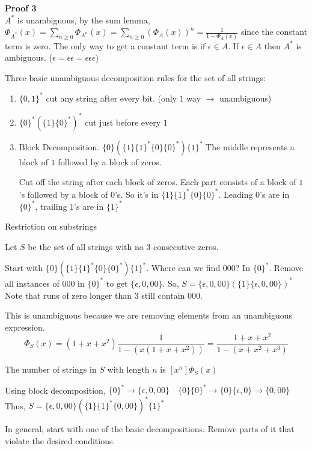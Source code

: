 \documentclass{article}
\begin{document}
\textbf{Proof 3\\}
$A^*$ is unambiguous, by the sum lemma, $\Phi_{A^*}(x) = \sum_{n \ge 0}\Phi_{A^n}(x) = \sum_{n \ge 0}(\Phi_A(x))^n = \frac{1}{1 - \Phi_A(x)}$ since the constant term is zero. The only way to get a constant term is if $\epsilon \in A$. If $\epsilon \in A$ then $A^*$ is ambiguous. ($\epsilon = \epsilon \epsilon = \epsilon \epsilon \epsilon$)

Three basic unambiguous decomposition rules for the set of all strings:
\begin{enumerate}
	\item $\{ 0,1 \}^*$ cut any string after every bit. (only $1$ way $\rightarrow$ unambiguous)
	\item $\{ 0 \}^*(\{1\}\{0\}^*)^*$ cut just before every $1$
	\item Block Decomposition. $\{0\}(\{1\}\{1\}^*\{0\}\{0\}^*)\{1\}^*$ The middle represents a block of $1$ followed by a block of zeros.

		Cut off the string after each block of zeros. Each part consists of a block of $1$'s followed by a block of $0$'s. So it's in $\{1\}\{1\}^*\{0\}\{0\}^*$. Leading $0$'s are in $\{0\}^*$, trailing $1$'s are in $\{1\}^*$
\end{enumerate}

Restriction on substrings

\example
Let $S$ be the set of all strings with no $3$ consecutive zeros.

Start with $\{0\}(\{1\}\{1\}^*\{0\}\{0\}^*)\{1\}^*$. Where can we find $000$? In $\{0\}^*$. Remove all instances of $000$ in $\{0\}^*$ to get $\{ \epsilon , 0, 00 \}$. So, $S = \{ \epsilon , 0, 00 \}(\{1\}\{ \epsilon , 0,00\})^*$ Note that runs of zero longer than $3$ still contain $000$.

This is unambiguous because we are removing elements from an unambiguous expression.
$$\Phi_S(x) = (1+x+x^2)\frac{1}{1-(x(1+x+x^2))} = \frac{1 + x+x^2}{1-(x+x^2+x^3)}$$

The number of strings in $S$ with length $n$ is $[x^n]\Phi_S(x)$

Using block decomposition, $\{0\}^* \rightarrow \{ \epsilon , 0,00 \} \quad \{0\}\{0\}^* \rightarrow \{0\}\{ \epsilon, 0\} \rightarrow \{0,00\}$ Thus, $S = \{ \epsilon,0,00\}(\{1\}\{1\}^*\{0,00\})^*\{1\}^*$

In general, start with one of the basic decompositions. Remove parts of it that violate the desired conditions.

\end{document}
